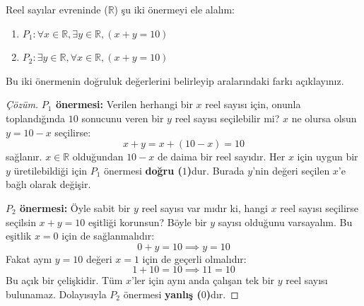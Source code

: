 \begin{example}
Reel sayılar evreninde ($\mathbb{R}$) şu iki önermeyi ele alalım:
\begin{enumerate}
  \item $P_1: \forall x \in \mathbb{R}, \exists y \in \mathbb{R}, (x + y = 10)$
  \item $P_2: \exists y \in \mathbb{R}, \forall x \in \mathbb{R}, (x + y = 10)$
\end{enumerate}
Bu iki önermenin doğruluk değerlerini belirleyip aralarındaki farkı açıklayınız.
\end{example}
\begin{proof}[Çözüm]
\textbf{$P_1$ önermesi:} Verilen herhangi bir $x$ reel sayısı için, onunla toplandığında $10$ sonucunu veren bir $y$ reel sayısı seçilebilir mi? 
$x$ ne olursa olsun $y = 10 - x$ seçilirse:
\[ x + y = x + (10 - x) = 10 \]
sağlanır. $x \in \mathbb{R}$ olduğundan $10 - x$ de daima bir reel sayıdır. Her $x$ için uygun bir $y$ üretilebildiği için $P_1$ önermesi \textbf{doğru ($1$)}dur. Burada $y$'nin değeri seçilen $x$'e bağlı olarak değişir.

\textbf{$P_2$ önermesi:} Öyle sabit bir $y$ reel sayısı var mıdır ki, hangi $x$ reel sayısı seçilirse seçilsin $x + y = 10$ eşitliği korunsun?
Böyle bir $y$ sayısı olduğunu varsayalım. Bu eşitlik $x = 0$ için de sağlanmalıdır:
\[ 0 + y = 10 \implies y = 10 \]
Fakat aynı $y = 10$ değeri $x = 1$ için de geçerli olmalıdır:
\[ 1 + 10 = 10 \implies 11 = 10 \]
Bu açık bir çelişkidir. Tüm $x$'ler için aynı anda çalışan tek bir $y$ reel sayısı bulunamaz. Dolayısıyla $P_2$ önermesi \textbf{yanlış ($0$)}dır.
\end{proof}

